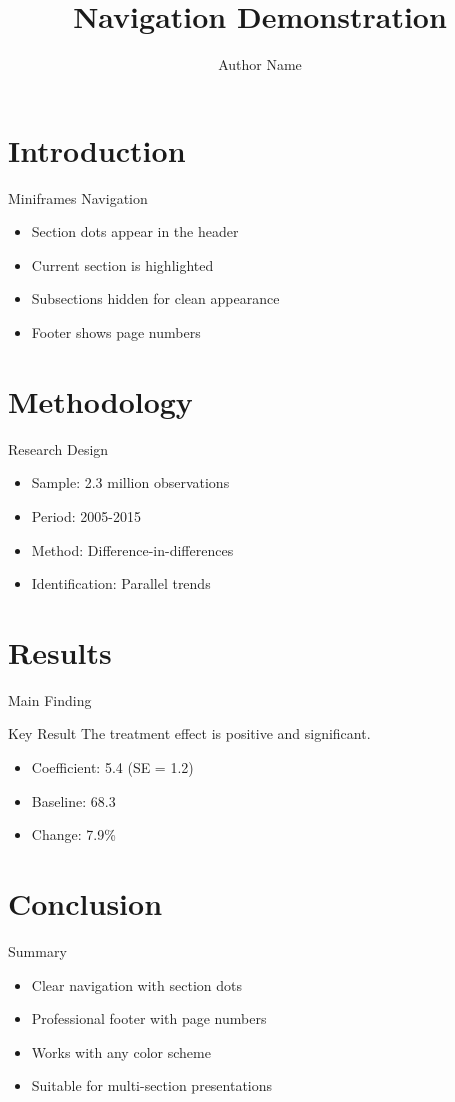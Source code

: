 \documentclass[10pt]{beamer}
\title[]{Navigation Demonstration}
\author[]{Author Name}
\institute[]{Institution Name}
\date{}
\begin{document}
\section{Introduction}

\begin{frame}{Miniframes Navigation}
  \begin{itemize}
    \item Section dots appear in the header
    \item Current section is highlighted
    \item Subsections hidden for clean appearance
    \item Footer shows page numbers
  \end{itemize}
\end{frame}

\section{Methodology}

\begin{frame}{Research Design}
  \begin{itemize}
    \item Sample: 2.3 million observations
    \item Period: 2005-2015
    \item Method: Difference-in-differences
    \item Identification: Parallel trends
  \end{itemize}
\end{frame}

\section{Results}

\begin{frame}{Main Finding}
  \begin{block}{Key Result}
    The treatment effect is positive and significant.
  \end{block}
  
  \begin{itemize}
    \item Coefficient: 5.4 (SE = 1.2)
    \item Baseline: 68.3
    \item Change: 7.9\%
  \end{itemize}
\end{frame}

\section{Conclusion}

\begin{frame}{Summary}
  \begin{itemize}
    \item Clear navigation with section dots
    \item Professional footer with page numbers
    \item Works with any color scheme
    \item Suitable for multi-section presentations
  \end{itemize}
\end{frame}
\end{document}
